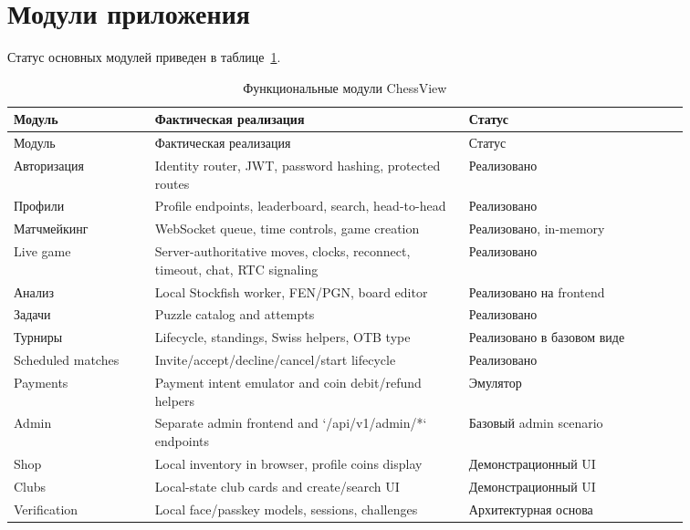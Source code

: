 \documentclass[14pt,a4paper]{extreport}
\begin{document}
\section{Модули приложения}

Статус основных модулей приведен в таблице~\ref{tab:modules}.

\begin{center}
\scriptsize
\setlength{\tabcolsep}{4pt}
\renewcommand{\arraystretch}{1.25}
\begin{longtable}{|>{\RaggedRight\arraybackslash}p{0.18\linewidth}|>{\RaggedRight\arraybackslash}p{0.40\linewidth}|>{\RaggedRight\arraybackslash}p{0.28\linewidth}|}
\caption{Функциональные модули ChessView}\label{tab:modules}\\
\hline
Модуль & Фактическая реализация & Статус\\ \hline
\endfirsthead
\hline
Модуль & Фактическая реализация & Статус\\ \hline
\endhead
Авторизация & Identity router, JWT, password hashing, protected routes & Реализовано\\ \hline
Профили & Profile endpoints, leaderboard, search, head-to-head & Реализовано\\ \hline
Матчмейкинг & WebSocket queue, time controls, game creation & Реализовано, in-memory\\ \hline
Live game & Server-authoritative moves, clocks, reconnect, timeout, chat, RTC signaling & Реализовано\\ \hline
Анализ & Local Stockfish worker, FEN/PGN, board editor & Реализовано на frontend\\ \hline
Задачи & Puzzle catalog and attempts & Реализовано\\ \hline
Турниры & Lifecycle, standings, Swiss helpers, OTB type & Реализовано в базовом виде\\ \hline
Scheduled matches & Invite/accept/decline/cancel/start lifecycle & Реализовано\\ \hline
Payments & Payment intent emulator and coin debit/refund helpers & Эмулятор\\ \hline
Admin & Separate admin frontend and `/api/v1/admin/*` endpoints & Базовый admin scenario\\ \hline
Shop & Local inventory in browser, profile coins display & Демонстрационный UI\\ \hline
Clubs & Local-state club cards and create/search UI & Демонстрационный UI\\ \hline
Verification & Local face/passkey models, sessions, challenges & Архитектурная основа\\ \hline
\end{longtable}
\end{center}
\end{document}
